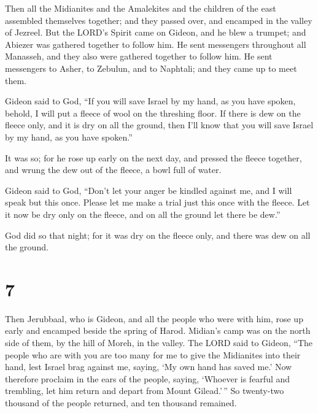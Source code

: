  Then all the Midianites and the Amalekites and the
children of the east assembled themselves together; and they passed
over, and encamped in the valley of Jezreel.  But the
LORD's Spirit came on Gideon, and he blew a trumpet; and Abiezer was
gathered together to follow him.  He sent messengers
throughout all Manasseh, and they also were gathered together to follow
him. He sent messengers to Asher, to Zebulun, and to Naphtali; and they
came up to meet them.

 Gideon said to God, ``If you will save Israel by my hand,
as you have spoken,  behold, I will put a fleece of wool on
the threshing floor. If there is dew on the fleece only, and it is dry
on all the ground, then I'll know that you will save Israel by my hand,
as you have spoken.''

 It was so; for he rose up early on the next day, and
pressed the fleece together, and wrung the dew out of the fleece, a bowl
full of water.

 Gideon said to God, ``Don't let your anger be kindled
against me, and I will speak but this once. Please let me make a trial
just this once with the fleece. Let it now be dry only on the fleece,
and on all the ground let there be dew.''

 God did so that night; for it was dry on the fleece only,
and there was dew on all the ground.

\hypertarget{section-6}{%
\section{7}\label{section-6}}

 Then Jerubbaal, who is Gideon, and all the people who were
with him, rose up early and encamped beside the spring of Harod.
Midian's camp was on the north side of them, by the hill of Moreh, in
the valley.  The LORD said to Gideon, ``The people who are
with you are too many for me to give the Midianites into their hand,
lest Israel brag against me, saying, `My own hand has saved me.'
 Now therefore proclaim in the ears of the people, saying,
`Whoever is fearful and trembling, let him return and depart from Mount
Gilead.'\,'' So twenty-two thousand of the people returned, and ten
thousand remained.

